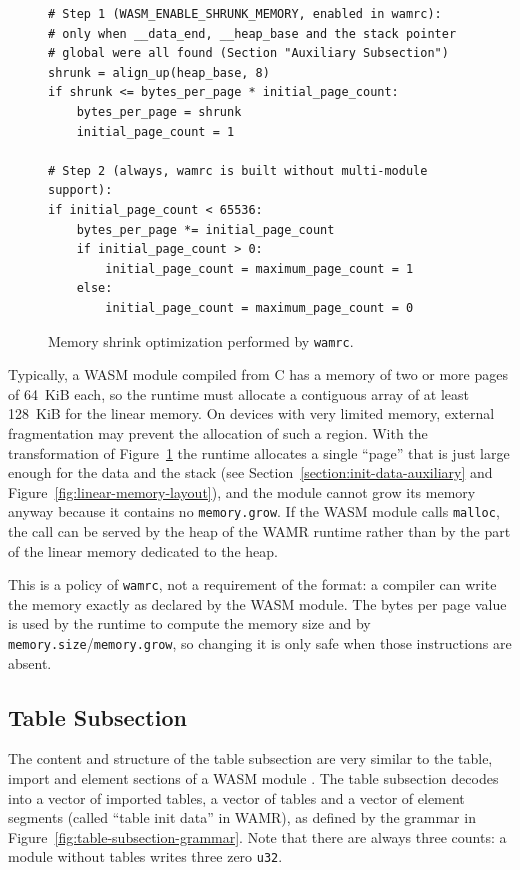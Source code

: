 \documentclass{article}
\begin{document}
\begin{figure}[H]
\begin{verbatim}
# Step 1 (WASM_ENABLE_SHRUNK_MEMORY, enabled in wamrc):
# only when __data_end, __heap_base and the stack pointer
# global were all found (Section "Auxiliary Subsection")
shrunk = align_up(heap_base, 8)
if shrunk <= bytes_per_page * initial_page_count:
    bytes_per_page = shrunk
    initial_page_count = 1

# Step 2 (always, wamrc is built without multi-module support):
if initial_page_count < 65536:
    bytes_per_page *= initial_page_count
    if initial_page_count > 0:
        initial_page_count = maximum_page_count = 1
    else:
        initial_page_count = maximum_page_count = 0
\end{verbatim}
\caption{Memory shrink optimization performed by \texttt{wamrc}.}
\label{fig:memory-shrink-optimization}
\end{figure}

Typically, a WASM module compiled from C has a memory of two or more pages of 64~KiB each, so the runtime must allocate a contiguous array of at least 128~KiB for the linear memory.
On devices with very limited memory, external fragmentation may prevent the allocation of such a region.
With the transformation of Figure~\ref{fig:memory-shrink-optimization} the runtime allocates a single ``page'' that is just large enough for the data and the stack (see Section~\ref{section:init-data-auxiliary} and Figure~\ref{fig:linear-memory-layout}), and the module cannot grow its memory anyway because it contains no \verb|memory.grow|.
If the WASM module calls \verb|malloc|, the call can be served by the heap of the WAMR runtime rather than by the part of the linear memory dedicated to the heap.

This is a policy of \texttt{wamrc}, not a requirement of the format: a compiler can write the memory exactly as declared by the WASM module.
The bytes per page value is used by the runtime to compute the memory size and by \verb|memory.size|/\verb|memory.grow|, so changing it is only safe when those instructions are absent.

\subsection{Table Subsection}
\label{sec:table-subsection}

The content and structure of the table subsection are very similar to the table, import and element sections of a WASM module \cite[Secs.~5.5.5, 5.5.7 and 5.5.12]{webassembly2019core}.
The table subsection decodes into a vector of imported tables, a vector of tables and a vector of element segments (called ``table init data'' in WAMR), as defined by the grammar in Figure~\ref{fig:table-subsection-grammar}.
Note that there are always three counts: a module without tables writes three zero \verb|u32|.
\end{document}
